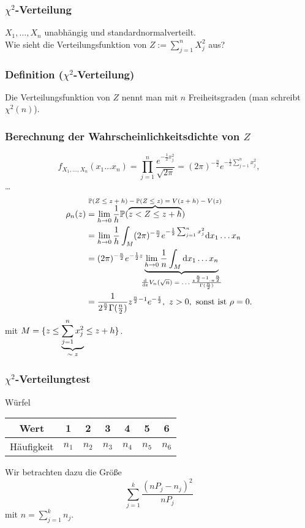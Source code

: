 \subsubsection{$\chi^2$-Verteilung}
 $X_1,\ldots,X_n$ unabh\"angig und standardnormalverteilt.\\
 Wie sieht die Verteilungsfunktion von $Z:=\sum_{j=1}^nX_j^2$ aus?
\subsubsection{Definition ($\chi^2$-Verteilung)}
Die Verteilungsfunktion von $Z$ nennt man  mit $n$ Freiheitsgraden (man schreibt $\chi^2(n)$).
\subsubsection{Berechnung der Wahrscheinlichkeitsdichte von $Z$}
\[
f_{X_1,\ldots,X_n}(x_1\ldots x_n)=\prod_{j=1}^n\frac{e^{-\frac{1}{2}x_j^2}}{\sqrt{2\pi}}=(2\pi)^{-\frac{n}{2}}e^{-\frac{1}{2}\sum_{j=1}^nx_j^2},
\]
\ldots
\begin{align*}
\rho_n(z)
&=\lim_{h\to0}\frac{1}{h}\mathbb{P}(\obr{z<Z\leq z+h}{$\mathbb{P}(Z\leq z+h)-\mathbb{P}(Z\leq z)=V(z+h)-V(z)$})\\
&=\lim_{h\to0}\frac{1}{h}\int_M(2\pi)^{-\frac{n}{2}}e^{-\frac{1}{2}\sum_{j=1}^nx_j^2}\mathrm{d}x_1\ldots x_n\\
&=(2\pi)^{-\frac{n}{2}}e^{-\frac{1}{2}z}\ubr{\lim_{h\to0}\frac{1}{n}\int_M\mathrm{d}x_1\ldots x_n}{$\frac{\mathrm{d}}{\mathrm{dz}} V_n(\sqrt{n})=\ldots\frac{z^{\frac{n}{2}-1}\cdot\pi^{\frac{n}{2}}}{\Gamma(\frac{n}{2})}$}\\
&=
\frac{1}{2^{\frac{n}{2}}\Gamma(\frac{n}{2})}z^{\frac{n}{2}-1}e^{-\frac{z}{2}},\ z>0,\ \text{sonst ist }\rho=0.
\end{align*}
mit $M=\{z\leq\ubr{\sum_{j=1}^nx_j^2}{$\sim z$}\leq z+h\}$.
\subsubsection{$\chi^2$-Verteilungtest}
 W\"urfel
\begin{center}
\begin{tabular}{c|c|c|c|c|c|c}
Wert&1&2&3&4&5&6\\
\hline
H\"aufigkeit&$n_1$&$n_2$&$n_3$&$n_4$&$n_5$&$n_6$
\end{tabular}
\end{center}
Wir betrachten dazu die Gr\"o\ss{}e
\[
\sum_{j=1}^k\frac{(nP_j-n_j)^2}{nP_j}
\]
mit $n=\sum_{j=1}^kn_j$.
